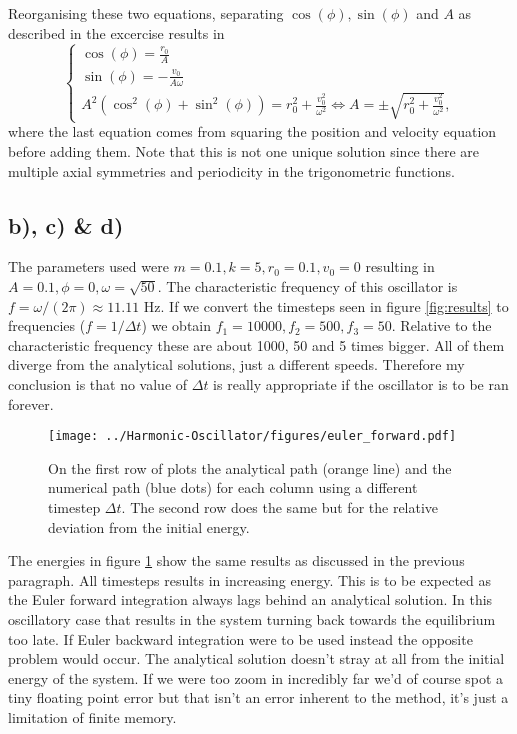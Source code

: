 \documentclass[a4paper, 12pt]{article}
\begin{document}
Reorganising these two equations, separating $\cos(\phi), \sin(\phi)$ and $A$ as described in the excercise results in
\begin{equation}
    \begin{cases}
        \cos(\phi) = \frac{r_0}{A} \\
        \sin(\phi) = -\frac{v_0}{A \omega} \\
        A^2(\cos^2(\phi) + \sin^2(\phi)) = r_0^2 + \frac{v_0^2}{\omega^2} \iff A = \pm \sqrt{r_0^2 + \frac{v_0^2}{\omega^2}},
    \end{cases}
\end{equation}
where the last equation comes from squaring the position and velocity equation before adding them. Note that this is not one unique solution since there are multiple axial symmetries and periodicity in the trigonometric functions.

\subsection*{b), c) \& d)}
The parameters used were $m=0.1, k=5, r_0=0.1, v_0=0$ resulting in $A=0.1,\phi=0,\omega=\sqrt{50}$. The characteristic frequency of this oscillator is $f=\omega/(2\pi) \approx 11.11$ Hz. If we convert the timesteps seen in figure \ref{fig:results} to frequencies ($f=1/\Delta t$) we obtain $f_1 = 10000, f_2 = 500, f_3 = 50$. Relative to the characteristic frequency these are about 1000, 50 and 5 times bigger. All of them diverge from the analytical solutions, just a different speeds. Therefore my conclusion is that no value of $\Delta t$ is really appropriate if the oscillator is to be ran forever.

\begin{figure}[h!]
    \texttt{[image: ../Harmonic-Oscillator/figures/euler\_forward.pdf]}
    \caption{On the first row of plots the analytical path (orange line) and the numerical path (blue dots) for each column using a different timestep $\Delta t$. The second row does the same but for the relative deviation from the initial energy.}
    \label{fig:euler_results}
\end{figure}

The energies in figure \ref{fig:euler_results} show the same results as discussed in the previous paragraph. All timesteps results in increasing energy. This is to be expected as the Euler forward integration always lags behind an analytical solution. In this oscillatory case that results in the system turning back towards the equilibrium too late. If Euler backward integration were to be used instead the opposite problem would occur. The analytical solution doesn't stray at all from the initial energy of the system. If we were too zoom in incredibly far we'd of course spot a tiny floating point error but that isn't an error inherent to the method, it's just a limitation of finite memory.
\end{document}
